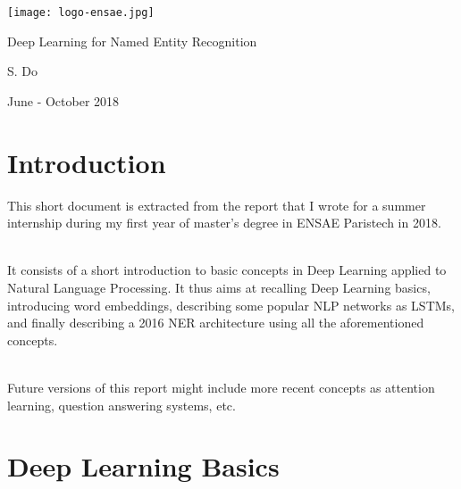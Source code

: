 \documentclass{article}
\begin{document}
    
    \begin{titlepage} 


     \begin{flushright}
     \texttt{[image: logo-ensae.jpg]}
     \end{flushright}
    \hrulefill
    \begin{center}\Huge
    Deep Learning for Named Entity Recognition \\ 
    \end{center}
    \hrulefill
    \vspace*{1cm}
    \begin{center} \Large
    S. Do
    \end{center}
 
     \begin{flushright}
         June - October 2018
     \end{flushright}
    \end{titlepage}
    
\newpage


\newpage
\section*{Introduction}


This short document is extracted from the report that I wrote
for a summer internship during my first year of master's 
degree in ENSAE Paristech in 2018. \\ \par 
 It consists of a short
 introduction to basic concepts in Deep Learning 
 applied to Natural Language Processing. It thus aims at 
 recalling Deep Learning basics, introducing word embeddings,
  describing some popular NLP networks as LSTMs, and finally
   describing a 2016 NER architecture using all the
    aforementioned concepts. \\ \par 
    Future versions of this report 
    might include more recent concepts as attention learning, 
    question answering systems, etc. 
\newpage 


\newpage
\tableofcontents
\newpage 



\newpage

\section{Deep Learning Basics}
\end{document}
